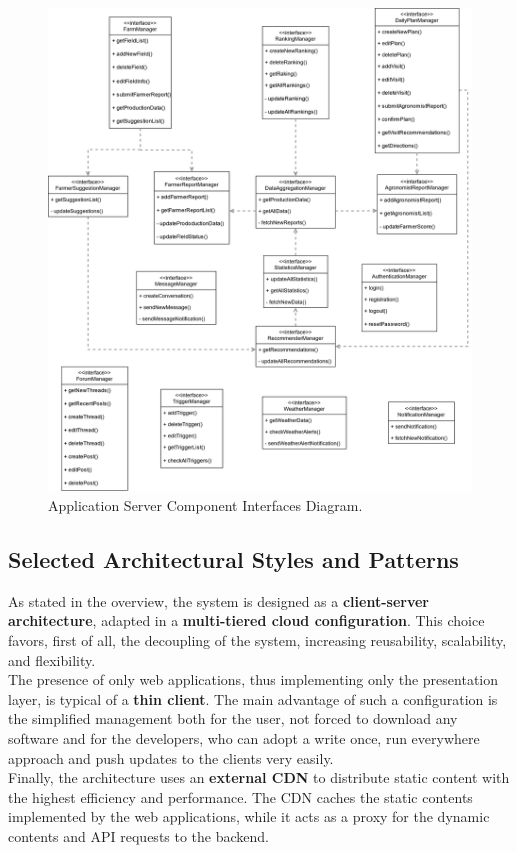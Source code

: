 \begin{figure}[H]
\centering
\includegraphics[width=\textwidth]{../images_diagrams/dd/component_interfaces_diagram.png}
\caption{Application Server Component Interfaces Diagram.}
\label{fig:componentInterface}
\end{figure}

\subsection{Selected Architectural Styles and Patterns}
As stated in the overview, the system is designed as a \textbf{client-server architecture}, adapted in a \textbf{multi-tiered cloud configuration}. This choice favors, first of all, the decoupling of the system, increasing reusability, scalability, and flexibility.\smallskip \\
The presence of only web applications, thus implementing only the presentation layer, is typical of a \textbf{thin client}. The main advantage of such a configuration is the simplified management both for the user, not forced to download any software and for the developers, who can adopt a write once, run everywhere approach and push updates to the clients very easily.\smallskip \\
Finally, the architecture uses an \textbf{external CDN} to distribute static content with the highest efficiency and performance. The CDN caches the static contents implemented by the web applications, while it acts as a proxy for the dynamic contents and API requests to the backend.\\

